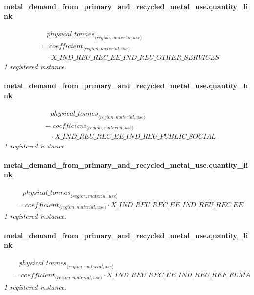 \documentclass[11pt]{article}
\begin{document}
\paragraph{metal\_demand\_from\_primary\_and\_recycled\_metal\_use.quantity\_link}
\begin{align*}
&\quad {physical\_tonnes}_{\langle region, material, use\rangle}\\
&= coefficient_{\langle region, material, use\rangle}\\
&\quad {}\cdot X\_IND\_REU\_REC\_EE\_IND\_REU\_OTHER\_SERVICES
\end{align*}
\noindent\emph{1 registered instance.}\par
\paragraph{metal\_demand\_from\_primary\_and\_recycled\_metal\_use.quantity\_link}
\begin{align*}
&\quad {physical\_tonnes}_{\langle region, material, use\rangle}\\
&= coefficient_{\langle region, material, use\rangle}\\
&\quad {}\cdot X\_IND\_REU\_REC\_EE\_IND\_REU\_PUBLIC\_SOCIAL
\end{align*}
\noindent\emph{1 registered instance.}\par
\paragraph{metal\_demand\_from\_primary\_and\_recycled\_metal\_use.quantity\_link}
\begin{align*}
&\quad {physical\_tonnes}_{\langle region, material, use\rangle}\\
&= coefficient_{\langle region, material, use\rangle} \cdot X\_IND\_REU\_REC\_EE\_IND\_REU\_REC\_EE
\end{align*}
\noindent\emph{1 registered instance.}\par
\paragraph{metal\_demand\_from\_primary\_and\_recycled\_metal\_use.quantity\_link}
\begin{align*}
&\quad {physical\_tonnes}_{\langle region, material, use\rangle}\\
&= coefficient_{\langle region, material, use\rangle} \cdot X\_IND\_REU\_REC\_EE\_IND\_REU\_REF\_ELMA
\end{align*}
\noindent\emph{1 registered instance.}\par
\end{document}
